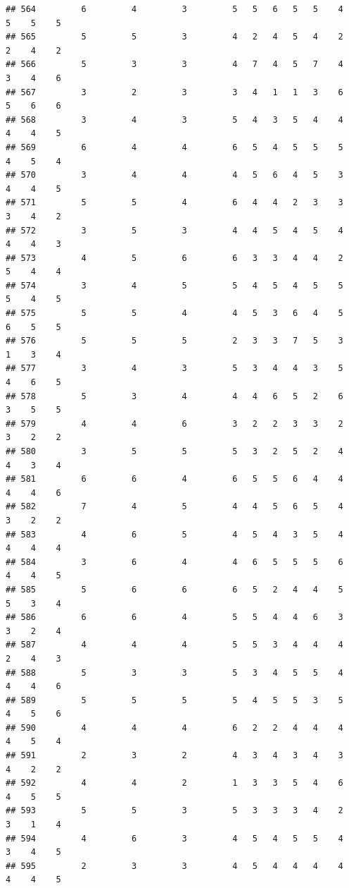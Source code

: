 \documentclass[
]{article}
\begin{document}
\begin{verbatim}
## 564         6         4         3         5   5   6   5   5    4    5    5    5
## 565         5         5         3         4   2   4   5   4    2    2    4    2
## 566         5         3         3         4   7   4   5   7    4    3    4    6
## 567         3         2         3         3   4   1   1   3    6    5    6    6
## 568         3         4         3         5   4   3   5   4    4    4    4    5
## 569         6         4         4         6   5   4   5   5    5    4    5    4
## 570         3         4         4         4   5   6   4   5    3    4    4    5
## 571         5         5         4         6   4   4   2   3    3    3    4    2
## 572         3         5         3         4   4   5   4   5    4    4    4    3
## 573         4         5         6         6   3   3   4   4    2    5    4    4
## 574         3         4         5         5   4   5   4   5    5    5    4    5
## 575         5         5         4         4   5   3   6   4    5    6    5    5
## 576         5         5         5         2   3   3   7   5    3    1    3    4
## 577         3         4         3         5   3   4   4   3    5    4    6    5
## 578         5         3         4         4   4   6   5   2    6    3    5    5
## 579         4         4         6         3   2   2   3   3    2    3    2    2
## 580         3         5         5         5   3   2   5   2    4    4    3    4
## 581         6         6         4         6   5   5   6   4    4    4    4    6
## 582         7         4         5         4   4   5   6   5    4    3    2    2
## 583         4         6         5         4   5   4   3   5    4    4    4    4
## 584         3         6         4         4   6   5   5   5    6    4    4    5
## 585         5         6         6         6   5   2   4   4    5    5    3    4
## 586         6         6         4         5   5   4   4   6    3    3    2    4
## 587         4         4         4         5   5   3   4   4    4    2    4    3
## 588         5         3         3         5   3   4   5   5    4    4    4    6
## 589         5         5         5         5   4   5   5   3    5    4    5    6
## 590         4         4         4         6   2   2   4   4    4    4    5    4
## 591         2         3         2         4   3   4   3   4    3    4    2    2
## 592         4         4         2         1   3   3   5   4    6    4    5    5
## 593         5         5         3         5   3   3   3   4    2    3    1    4
## 594         4         6         3         4   5   4   5   5    4    3    4    5
## 595         2         3         3         4   5   4   4   4    4    4    4    5

\end{verbatim}
\end{document}
